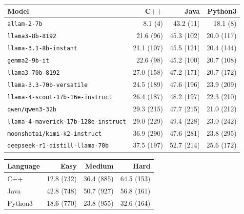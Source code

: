 \begin{tabular}{lrrr}
\hline\hline
\textbf{Model} & \textbf{C++} & \textbf{Java} & \textbf{Python3} \\
\hline
\texttt{allam-2-7b} & 8.1 {\scriptsize(4)} & 43.2 {\scriptsize(11)} & 18.1 {\scriptsize(8)} \\
\texttt{llama3-8b-8192} & 21.6 {\scriptsize(96)} & 45.3 {\scriptsize(102)} & 20.0 {\scriptsize(117)} \\
\texttt{llama-3.1-8b-instant} & 21.1 {\scriptsize(107)} & 45.5 {\scriptsize(121)} & 20.4 {\scriptsize(144)} \\
\texttt{gemma2-9b-it} & 22.6 {\scriptsize(98)} & 45.2 {\scriptsize(100)} & 20.7 {\scriptsize(108)} \\
\texttt{llama3-70b-8192} & 27.0 {\scriptsize(158)} & 47.2 {\scriptsize(171)} & 20.7 {\scriptsize(172)} \\
\texttt{llama-3.3-70b-versatile} & 24.5 {\scriptsize(189)} & 47.6 {\scriptsize(196)} & 23.9 {\scriptsize(209)} \\
\texttt{llama-4-scout-17b-16e-instruct} & 26.4 {\scriptsize(187)} & 48.2 {\scriptsize(197)} & 22.3 {\scriptsize(210)} \\
\texttt{qwen/qwen3-32b} & 29.3 {\scriptsize(215)} & 47.7 {\scriptsize(215)} & 21.0 {\scriptsize(212)} \\
\texttt{llama-4-maverick-17b-128e-instruct} & 29.0 {\scriptsize(229)} & 49.4 {\scriptsize(228)} & 23.0 {\scriptsize(242)} \\
\texttt{moonshotai/kimi-k2-instruct} & 36.9 {\scriptsize(290)} & 47.6 {\scriptsize(281)} & 23.8 {\scriptsize(295)} \\
\texttt{deepseek-r1-distill-llama-70b} & 37.5 {\scriptsize(197)} & 52.7 {\scriptsize(214)} & 25.6 {\scriptsize(172)} \\
\hline\hline
\end{tabular}

\begin{tabular}{lrrr}
\hline\hline
\textbf{Language} & \textbf{Easy} & \textbf{Medium} & \textbf{Hard} \\
\hline
C++ & 12.8 {\scriptsize(732)} & 36.4 {\scriptsize(885)} & 64.5 {\scriptsize(153)} \\
Java & 42.8 {\scriptsize(748)} & 50.7 {\scriptsize(927)} & 56.8 {\scriptsize(161)} \\
Python3 & 18.6 {\scriptsize(770)} & 23.8 {\scriptsize(955)} & 32.6 {\scriptsize(164)} \\
\hline\hline
\end{tabular}

